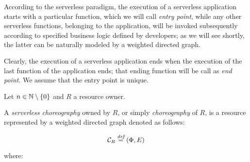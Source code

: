 According to the serverless paradigm, the execution of a serverless application starts with a particular function, which we will call \textit{entry point}, while any other serverless functions, belonging to the application, will be invoked subsequently according to specified business logic defined by developers; as we will see shortly, the latter can be naturally modeled by a weighted directed graph.

Clearly, the execution of a serverless application ends when the execution of the last function of the application ends; that ending function will be call as \textit{end point}. We assume that the entry point is unique.

Let $n \in \mathbb{N} \setminus \left\lbrace 0 \right\rbrace $ and $R$ a resource owner.

A \textit{serverless choreography} owned by $R$, or simply \textit{choreography} of $R$, is a resource represented by a weighted directed graph denoted as follows:

\begin{equation}
	\mathcal{C}_R \overset{\textit{def}}{=} (\Phi,E)
\end{equation}

where:

